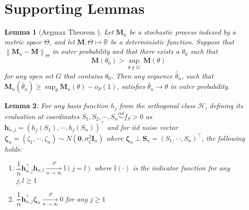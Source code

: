 \documentclass[
  12pt]{article}
\newcommand{\pnlim}{\xrightarrow[n \to \infty]{P}}
\newcommand{\calH}{\mathcal{H}}
\newcommand{\R}{\mathbb{R}}
\newcommand{\smallo}{o}
\newcommand{\bzet}{\boldsymbol{\zeta}}
\newcommand{\bh}{\boldsymbol{h}}
\newcommand{\bS}{\boldsymbol{S}}
\newcommand{\bM}{\boldsymbol{M}}
\newcommand{\bI}{\boldsymbol{I}}
\newtheorem{lemma}{Lemma}
\newcommand{\bzero}{\boldsymbol{0}}
\begin{document}
\section{Supporting Lemmas}\label{supsec:supp-lemmas}
\begin{lemma}[Argmax Theorem \citep{vaart1997weak}]\label{lem:argmax-thm}
        Let $\bM_n$ be a stochastic process indexed by a metric space $\Theta$, and let $\bM: \Theta \mapsto \R$ be a deterministic function. Suppose that $\left\|\bM_n - \bM\right\|_\Theta$ in outer probability and that there exists a $\theta_0$ such that 
        $$
        \bM(\theta_0) > \underset{\theta \notin G}{\sup} \,\bM(\theta)
        $$
        for any open set $G$ that contains $\theta_0$. Then any sequence $\hat{\theta}_n$, such that $\bM_n(\hat{\theta}_n) \geq \sup_\theta \bM_n(\theta) - \smallo_P(1)$, satisfies $\hat{\theta}_n \to \theta$ in outer probability.
    \end{lemma}
\begin{lemma}\label{lem:dot-prod-lim}
    For any basis function $h_j$ from the orthogonal class $\calH$, defining its evaluation at coordinates $S_1, S_2,\cdots,S_n \overset{iid}{\sim} f_S>0$ as $\bh_{n,j} = (h_j(S_1), \cdots,h_j(S_n))^\top$ and for iid noise vector $\bzet_n = (\zeta_1, \cdots, \zeta_n) \sim N(\bzero,\sigma^2_\zeta\bI_n)$ where $\bzet_n \perp \bS_n = (S_1, \cdots, S_n)^\top$, the following holds:
    \begin{enumerate}
        \item\label{basis-basis-dot} $\dfrac{1}{n} \bh_{n,j}^\top\bh_{n,l} \pnlim \mathbb{I}(j = l)$ where $\mathbb{I}(\cdot)$ is the indicator function for any $j,l \geq 1$
        \item\label{basis-noise-dot} $\dfrac{1}{n} \bh_{n,j}^\top\bzet_n \pnlim 0$ for any $j \geq 1$
    \end{enumerate}
\end{lemma}
\end{document}
